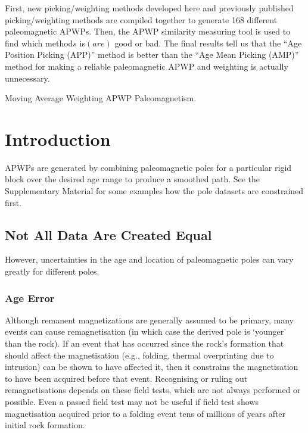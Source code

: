 \begin{summary}
First, new picking/weighting methods developed here and previously published
picking/weighting methods are compiled together to generate 168 different
paleomagnetic APWPs. Then, the APWP similarity measuring tool is used to find
which method\(s\) is$(are)$ good or bad. The final results tell us that the
``Age Position Picking (APP)'' method is better than the ``Age Mean Picking
(AMP)'' method for making a reliable paleomagnetic APWP and weighting is
actually unnecessary.
\end{summary}

\begin{keywords}
  Moving Average \textendash{} Weighting \textendash{} APWP \textendash{}
  Paleomagnetism.
\end{keywords}

\section{Introduction}

APWPs are generated by combining paleomagnetic poles for a particular rigid
block over the desired age range to produce a smoothed path. See the
Supplementary Material for some examples how the pole datasets are constrained
first.

\subsection{Not All Data Are Created Equal}

However, uncertainties in the age and location of paleomagnetic poles can vary
greatly for different poles.

\subsubsection{Age Error}

Although remanent magnetizations are generally assumed to be primary, many
events can cause remagnetisation (in which case the derived pole is `younger'
than the rock). If an event that has occurred since the rock's formation that
should affect the magnetisation (e.g., folding, thermal overprinting due to
intrusion) can be shown to have affected it, then it constrains the
magnetisation to have been acquired before that event. Recognising or ruling
out remagnetisations depends on these field tests, which are not always
performed or possible. Even a passed field test may not be useful if field test
shows magnetisation acquired prior to a folding event tens of millions of years
after initial rock formation.

